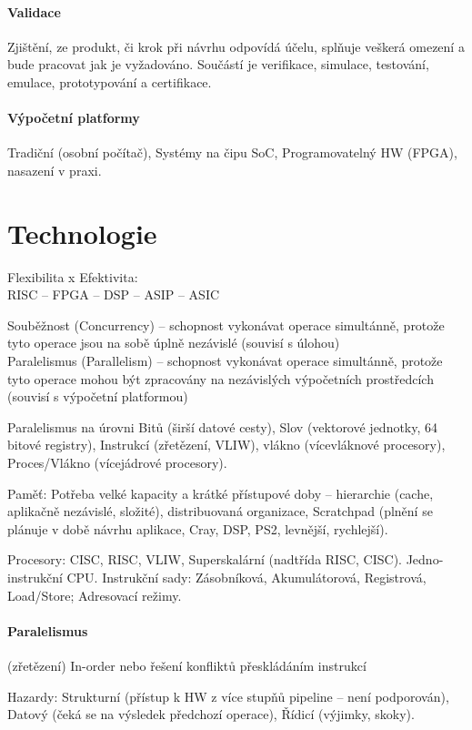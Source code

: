 \documentclass[a4paper, 11pt]{report}
\begin{document}
\paragraph{Validace}
Zjištění, ze produkt, či krok při návrhu odpovídá účelu, splňuje veškerá omezení a bude pracovat jak je vyžadováno. Součástí je verifikace, simulace, testování, emulace, prototypování a certifikace.

\paragraph{Výpočetní platformy}
Tradiční (osobní počítač), Systémy na čipu SoC, Programovatelný HW (FPGA), nasazení v praxi.

\section{Technologie}

Flexibilita x Efektivita:\\
RISC -- FPGA -- DSP -- ASIP -- ASIC

Souběžnost (Concurrency) -- schopnost vykonávat operace simultánně, protože tyto operace jsou na sobě úplně nezávislé (souvisí s úlohou)\\
Paralelismus (Parallelism) -- schopnost vykonávat operace simultánně, protože tyto operace mohou být zpracovány na nezávislých výpočetních prostředcích (souvisí s výpočetní platformou)

Paralelismus na úrovni Bitů (širší datové cesty), Slov (vektorové jednotky, 64 bitové registry), Instrukcí (zřetězení, VLIW), vlákno (vícevláknové procesory), Proces/Vlákno (vícejádrové procesory).

Paměť: Potřeba velké kapacity a krátké přístupové doby -- hierarchie (cache, aplikačně nezávislé, složité), distribuovaná organizace, Scratchpad (plnění se plánuje v době návrhu aplikace, Cray, DSP, PS2, levnější, rychlejší).

Procesory: CISC, RISC, VLIW, Superskalární (nadtřída RISC, CISC). Jedno-instrukční CPU.
Instrukční sady: Zásobníková, Akumulátorová, Registrová, Load/Store; Adresovací režimy.

\paragraph{Paralelismus} (zřetězení)
In-order nebo řešení konfliktů přeskládáním instrukcí

Hazardy: Strukturní (přístup k HW z více stupňů pipeline -- není podporován), Datový (čeká se na výsledek předchozí operace), Řídicí (výjimky, skoky).
\end{document}
